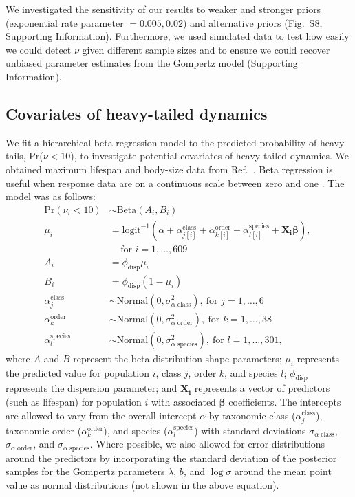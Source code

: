 \documentclass[9pt,twocolumn,twoside]{pnas-new}
\newcommand{\figpriors}{{8}}
\begin{document}
{We investigated the sensitivity
of our results to weaker and stronger priors (exponential rate parameter $=
0.005, 0.02$) and alternative priors (Fig.~S\figpriors, Supporting Information).
Furthermore, we used
simulated data to test how easily we could detect $\nu$ given different sample
sizes and to ensure we could recover unbiased parameter estimates from the
Gompertz model (Supporting Information).

\subsection{Covariates of heavy-tailed dynamics} We fit a hierarchical beta
regression model to the predicted probability of heavy tails, Pr(\(\nu < 10\)),
to investigate potential covariates of heavy-tailed dynamics. We obtained
maximum lifespan and body-size data from Ref.~\cite{brook2006a}.
Beta regression is useful when response data are on a continuous scale
between zero and one \cite{ferrari2004}. The model was as follows:
\begin{align*}
\mathrm{Pr}(\nu_i < 10) &\sim \mathrm{Beta}(A_i, B_i)\\
\mu_i &= \mathrm{logit}^{-1}(\alpha
  + \alpha^\mathrm{class}_{j[i]}
  + \alpha^\mathrm{order}_{k[i]}
  + \alpha^\mathrm{species}_{l[i]}
  + \pmb{X_i} \pmb{\beta}),
  \: \\
  &\quad \, \text{for } i = 1, \dots, 609\\
A_i &= \phi_\mathrm{disp} \mu_i\\
B_i &= \phi_\mathrm{disp} (1 - \mu_i)\\
\alpha^\mathrm{class}_j &\sim
  \mathrm{Normal}(0, \sigma^2_{\alpha \; \mathrm{class}}),
  \: \text{for } j = 1, \dots, 6\\
\alpha^\mathrm{order}_k &\sim
  \mathrm{Normal}(0, \sigma^2_{\alpha \; \mathrm{order}}),
  \: \text{for } k = 1, \dots, 38\\
\alpha^\mathrm{species}_l &\sim
  \mathrm{Normal}(0, \sigma^2_{\alpha \; \mathrm{species}}),
  \: \text{for } l = 1, \dots, 301,
\end{align*}
where \(A\) and \(B\) represent the beta distribution shape parameters;
\(\mu_i\) represents the predicted value for population \(i\), class \(j\),
order \(k\), and species \(l\); \(\phi_\mathrm{disp}\) represents the
dispersion parameter; and \(\pmb{X_i}\) represents a vector of predictors (such as
lifespan) for population \(i\) with associated \(\pmb{\beta}\) coefficients. The
intercepts are allowed to vary from the overall intercept \(\alpha\) by
taxonomic class (\(\alpha^\mathrm{class}_j\)), taxonomic order
(\(\alpha^\mathrm{order}_k\)), and species (\(\alpha^\mathrm{species}_l\)) with
standard deviations \(\sigma_{\alpha \; \mathrm{class}}\), \(\sigma_{\alpha \;
\mathrm{order}}\), and \(\sigma_{\alpha \; \mathrm{species}}\). Where possible,
we also allowed for error distributions around the predictors by incorporating
the standard deviation of the posterior samples for the Gompertz parameters
\(\lambda\), \(b\), and \(\log \sigma\) around the mean point value as normal
distributions (not shown in the above equation).

}
\end{document}
